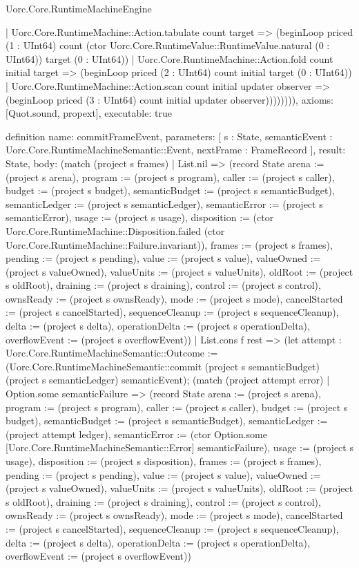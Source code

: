 \begin{lexlean}{Uorc.Core.RuntimeMachineEngine}
\begin{semanticmodule}
{              | Uorc.Core.RuntimeMachine::Action.tabulate count target => (beginLoop priced (1 : UInt64) count (ctor Uorc.Core.RuntimeValue::RuntimeValue.natural (0 : UInt64)) target (0 : UInt64))
              | Uorc.Core.RuntimeMachine::Action.fold count initial target => (beginLoop priced (2 : UInt64) count initial target (0 : UInt64))
              | Uorc.Core.RuntimeMachine::Action.scan count initial updater observer => (beginLoop priced (3 : UInt64) count initial updater observer)))))))),
  axioms: [Quot.sound, propext],
  executable: true
}

definition{
  name: commitFrameEvent,
  parameters: [
    s : State,
    semanticEvent : Uorc.Core.RuntimeMachineSemantic::Event,
    nextFrame : FrameRecord
  ],
  result: State,
  body: (match (project s frames)
    | List.nil => (record State {arena := (project s arena), program := (project s program), caller := (project s caller), budget := (project s budget), semanticBudget := (project s semanticBudget), semanticLedger := (project s semanticLedger), semanticError := (project s semanticError), usage := (project s usage), disposition := (ctor Uorc.Core.RuntimeMachine::Disposition.failed (ctor Uorc.Core.RuntimeMachine::Failure.invariant)), frames := (project s frames), pending := (project s pending), value := (project s value), valueOwned := (project s valueOwned), valueUnits := (project s valueUnits), oldRoot := (project s oldRoot), draining := (project s draining), control := (project s control), ownsReady := (project s ownsReady), mode := (project s mode), cancelStarted := (project s cancelStarted), sequenceCleanup := (project s sequenceCleanup), delta := (project s delta), operationDelta := (project s operationDelta), overflowEvent := (project s overflowEvent)})
    | List.cons f rest => (let attempt : Uorc.Core.RuntimeMachineSemantic::Outcome := (Uorc.Core.RuntimeMachineSemantic::commit (project s semanticBudget) (project s semanticLedger) semanticEvent); (match (project attempt error)
      | Option.some semanticFailure => (record State {arena := (project s arena), program := (project s program), caller := (project s caller), budget := (project s budget), semanticBudget := (project s semanticBudget), semanticLedger := (project attempt ledger), semanticError := (ctor Option.some [Uorc.Core.RuntimeMachineSemantic::Error] semanticFailure), usage := (project s usage), disposition := (project s disposition), frames := (project s frames), pending := (project s pending), value := (project s value), valueOwned := (project s valueOwned), valueUnits := (project s valueUnits), oldRoot := (project s oldRoot), draining := (project s draining), control := (project s control), ownsReady := (project s ownsReady), mode := (project s mode), cancelStarted := (project s cancelStarted), sequenceCleanup := (project s sequenceCleanup), delta := (project s delta), operationDelta := (project s operationDelta), overflowEvent := (project s overflowEvent)})
}
\end{semanticmodule}
\end{lexlean}
